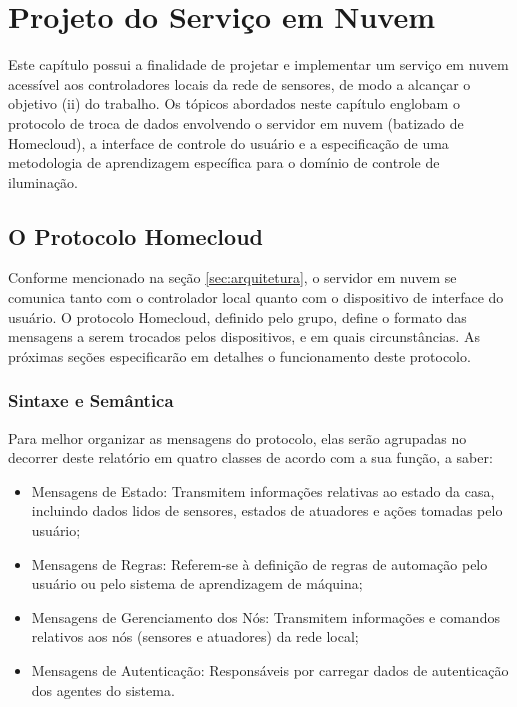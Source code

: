 \chapter{Projeto do Serviço em Nuvem}\label{chp:serviconuvem}
Este capítulo possui a finalidade de projetar e implementar um serviço em nuvem acessível aos controladores locais da rede de sensores, de modo a alcançar o objetivo (ii) do trabalho. Os tópicos abordados neste capítulo englobam o protocolo de troca de dados envolvendo o servidor em nuvem (batizado de Homecloud), a interface de controle do usuário e a especificação de uma metodologia de aprendizagem específica para o domínio de controle de iluminação.

\section{O Protocolo Homecloud} \label{sec:homecloud}
Conforme mencionado na seção \ref{sec:arquitetura}, o servidor em nuvem se comunica tanto com o controlador local quanto com o dispositivo de interface do usuário. O protocolo Homecloud, definido pelo grupo, define o formato das mensagens a serem trocados pelos dispositivos, e em quais circunstâncias. As próximas seções especificarão em detalhes o funcionamento deste protocolo.

\subsection{Sintaxe e Semântica} \label{subsec:hc_sintaxe}
Para melhor organizar as mensagens do protocolo, elas serão agrupadas no decorrer deste relatório em quatro classes de acordo com a sua função, a saber:

\begin{itemize}
	\item Mensagens de Estado: Transmitem informações relativas ao estado da casa, incluindo dados lidos de sensores, estados de atuadores e ações tomadas pelo usuário;
	\item Mensagens de Regras: Referem-se à definição de regras de automação pelo usuário ou pelo sistema de aprendizagem de máquina;
	\item Mensagens de Gerenciamento dos Nós: Transmitem informações e comandos relativos aos nós (sensores e atuadores) da rede local;
	\item Mensagens de Autenticação: Responsáveis por carregar dados de autenticação dos agentes do sistema.
\end{itemize}


